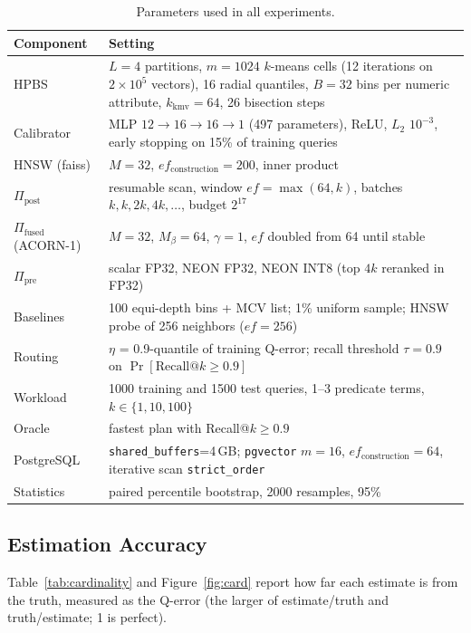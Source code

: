 \documentclass[sigconf,nonacm]{acmart}
\newcommand{\Ppre}{\Pi_{\text{pre}}}
\newcommand{\Pfus}{\Pi_{\text{fused}}}
\newcommand{\Ppost}{\Pi_{\text{post}}}
\begin{document}
\begin{table}[!t]
\footnotesize
\centering
\caption{Parameters used in all experiments.}
\label{tab:params}
\setlength{\tabcolsep}{3pt}
\begin{tabular}{@{}p{}p{}@{}}
\toprule
Component & Setting \\
\midrule
HPBS & $L=4$ partitions, $m=1024$ $k$-means cells (12 iterations on $2\times10^5$ vectors), 16 radial quantiles, $B=32$ bins per numeric attribute, $k_{\text{kmv}}=64$, 26 bisection steps \\
Calibrator & MLP $12\to16\to16\to1$ (497 parameters), ReLU, $L_2$ $10^{-3}$, early stopping on 15\% of training queries \\
HNSW (faiss) & $M=32$, $ef_{\text{construction}}=200$, inner product \\
$\Ppost$ & resumable scan, window $ef=\max(64,k)$, batches $k,k,2k,4k,\ldots$, budget $2^{17}$ \\
$\Pfus$ (ACORN-1) & $M=32$, $M_\beta=64$, $\gamma=1$, $ef$ doubled from 64 until stable \\
$\Ppre$ & scalar FP32, NEON FP32, NEON INT8 (top $4k$ reranked in FP32) \\
Baselines & 100 equi-depth bins + MCV list; 1\% uniform sample; HNSW probe of 256 neighbors ($ef=256$) \\
Routing & $\eta$ = 0.9-quantile of training Q-error; recall threshold $\tau=0.9$ on $\Pr[\text{Recall@}k\ge0.9]$ \\
Workload & 1000 training and 1500 test queries, 1--3 predicate terms, $k\in\{1,10,100\}$ \\
Oracle & fastest plan with Recall@$k\ge0.9$ \\
PostgreSQL & \texttt{shared\_buffers}=4\,GB; \texttt{pgvector} $m=16$, $ef_{\text{construction}}=64$, iterative scan \texttt{strict\_order} \\
Statistics & paired percentile bootstrap, 2000 resamples, 95\% \\
\bottomrule
\end{tabular}
\end{table}

\subsection{Estimation Accuracy}\label{sec:eval_card}
Table~\ref{tab:cardinality} and Figure~\ref{fig:card} report how far each estimate is from the truth, measured as the Q-error (the larger of estimate/truth and truth/estimate; 1 is perfect).
\end{document}
